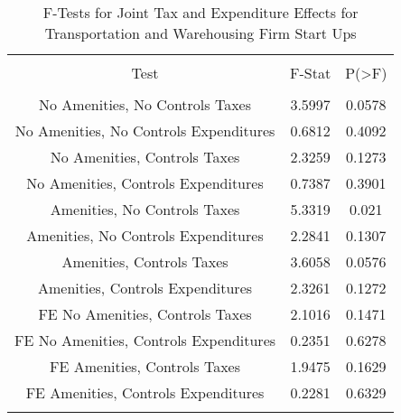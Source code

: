 
\begin{table}[!htbp] \centering 
  \caption{F-Tests for Joint Tax and Expenditure Effects for Transportation and Warehousing Firm Start Ups} 
  \label{48-49Ftests} 
\begin{tabular}{@{\extracolsep{5pt}} ccc} 
\\[-1.8ex]\hline 
\hline \\[-1.8ex] 
Test & F-Stat & P(\textgreater F) \\ 
\hline \\[-1.8ex] 
No Amenities, No Controls Taxes & 3.5997 & 0.0578 \\ 
No Amenities, No Controls Expenditures & 0.6812 & 0.4092 \\ 
No Amenities, Controls Taxes & 2.3259 & 0.1273 \\ 
No Amenities, Controls Expenditures & 0.7387 & 0.3901 \\ 
Amenities, No Controls Taxes & 5.3319 & 0.021 \\ 
Amenities, No Controls Expenditures & 2.2841 & 0.1307 \\ 
Amenities, Controls Taxes & 3.6058 & 0.0576 \\ 
Amenities, Controls Expenditures & 2.3261 & 0.1272 \\ 
FE No Amenities, Controls Taxes & 2.1016 & 0.1471 \\ 
FE No Amenities, Controls Expenditures & 0.2351 & 0.6278 \\ 
FE Amenities, Controls Taxes & 1.9475 & 0.1629 \\ 
FE Amenities, Controls Expenditures & 0.2281 & 0.6329 \\ 
\hline \\[-1.8ex] 
\end{tabular} 
\end{table} 
